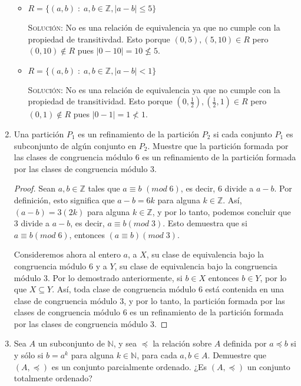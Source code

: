 \documentclass[letterpaper,11pt]{article}
\begin{document}
\begin{enumerate}
\begin{itemize}
        \item $R = \{(a,b) \; : \; a,b ∈ ℤ, |a-b| \leq 5\}$

        \textsc{Solución:} No es una relación de equivalencia ya que no cumple 
        con la propiedad de transitivdad. Esto porque $(0, 5), (5, 10) ∈ R$ 
        pero $(0, 10) ∉ R$ pues $|0 - 10| = 10 \not \leq 5$. 
        \item $R = \{(a,b) \; : \; a, b \in ℤ, |a-b| < 1\}$

        \textsc{Solución:} No es una relación de equivalencia ya que no cumple 
        con la propiedad de transitividad. Esto porque $(0, \frac{1}{2}), 
        (\frac{1}{2}, 1) ∈ R$ pero $(0, 1) ∉ R$ pues $|0 - 1| = 1 \not < 1$. 
    \end{itemize}

    \item Una partición $P_{1}$ es un refinamiento de la partición $P_{2}$ si 
    cada conjunto $P_{1}$ es subconjunto de algún conjunto en $P_{2}$. Muestre 
    que la partición formada por las clases de congruencia módulo $6$ es un 
    refinamiento de la partición formada por las clases de congruencia módulo 
    $3$.

    \begin{proof}
        Sean $a, b ∈ ℤ$ tales que $a ≡ b$ $(mod \; 6)$, es decir, $6$ divide a 
        $a - b$. Por definición, esto significa que $a - b = 6k$ para alguna 
        $k ∈ ℤ$. Así, $(a - b) = 3(2k)$ para alguna $k ∈ ℤ$, y por lo tanto,
        podemos concluir que $3$ divide a $a - b$, es decir, $a ≡ b (mod \; 3)$.
        Esto demuestra que si $a ≡ b (mod \; 6)$, entonces $(a ≡ b) (mod \; 3)$.

        Consideremos ahora al entero $a$, a $X$, su clase de equivalencia bajo
        la congruencia módulo $6$ y a $Y$, su clase de equivalencia bajo la 
        congruencia módulo $3$. Por lo demostrado anteriormente, si $b ∈ X$
        entonces $b ∈ Y$, por lo que $X ⊆ Y$. Así, toda clase de congruencia 
        módulo $6$ está contenida en una clase de congruencia módulo $3$, y 
        por lo tanto, la partición formada por las clases de congruencia módulo 
        $6$ es un refinamiento de la partición formada por las clases de 
        congruencia módulo $3$. 
        
    \end{proof}

    \item Sea $A$ un subconjunto de $ℕ$, y sea $\preceq$ la relación sobre $A$
    definida por $a \preceq b$ si y sólo si $b = a^{k}$ para alguna $k \in ℕ$,
    para cada $a,b \in A$. Demuestre que $(A, \preceq)$ es un conjunto 
    parcialmente ordenado. ¿Es $(A, \preceq)$ un conjunto totalmente ordenado?


\end{enumerate}
\end{document}
